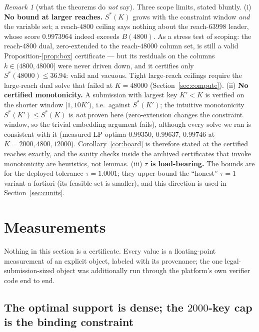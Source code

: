 \documentclass[11pt]{article}
\theoremstyle{remark}
\newtheorem{remark}[theorem]{Remark}
\newcommand{\Sstar}{S^{*}}
\begin{document}
\begin{remark}[what the theorems do \emph{not} say]\label{rem:monotone}
Three scope limits, stated bluntly.
(i) \textbf{No bound at larger reaches.} $\Sstar(K)$ grows with the
constraint window \emph{and} the variable set; a reach-$4800$ ceiling says
nothing about the reach-$63998$ leader, whose score $0.9973964$ indeed
exceeds $B(4800)$. As a stress test of scoping: the reach-$4800$ dual,
zero-extended to the reach-$48000$ column set, is still a valid
Proposition-\ref{prop:box} certificate --- but its residuals on the
columns $k \in (4800, 48000]$ were never driven down, and it certifies
only $\Sstar(48000) \le 36.94$: valid and vacuous. Tight large-reach
ceilings require the large-reach dual solve that failed at $K = 48000$
(Section~\ref{sec:compute}).
(ii) \textbf{No certified monotonicity.} A submission with largest key
$K' < K$ is verified on the shorter window $[1, 10K')$, i.e.\ against
$\Sstar(K')$; the intuitive monotonicity $\Sstar(K') \le \Sstar(K)$ is
\emph{not} proven here (zero-extension changes the constraint window, so
the trivial embedding argument fails), although every solve we ran is
consistent with it (measured LP optima $0.99350$, $0.99637$, $0.99746$ at
$K = 2000, 4800, 12000$). Corollary~\ref{cor:board} is therefore stated at
the certified reaches exactly, and the sanity checks inside the archived
certificates that invoke monotonicity are heuristics, not lemmas.
(iii) \textbf{$\tau$ is load-bearing.} The bounds are for the deployed
tolerance $\tau = 1.0001$; they upper-bound the ``honest'' $\tau = 1$
variant a fortiori (its feasible set is smaller), and this direction is
used in Section~\ref{sec:cunits}.
\end{remark}

\section{Measurements}\label{sec:measure}

Nothing in this section is a certificate. Every value is a floating-point
measurement of an explicit object, labeled with its provenance; the one
legal-submission-sized object was additionally run through the platform's
own verifier code end to end.

\subsection{The optimal support is dense; the $2000$-key cap is the
binding constraint}\label{sec:card}
\end{document}

